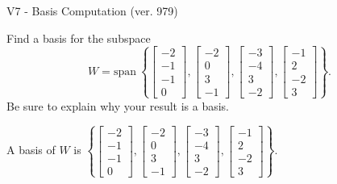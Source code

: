 \begin{exercise}
  \begin{exerciseTitle}V7 - Basis Computation (ver. 979)\end{exerciseTitle}
  \begin{exerciseStatement}
    Find a basis for the subspace 
\[W=\mathrm{span}\ \left\{\left[\begin{array}{r}
-2 \\
-1 \\
-1 \\
0
\end{array}\right] , \left[\begin{array}{r}
-2 \\
0 \\
3 \\
-1
\end{array}\right] , \left[\begin{array}{r}
-3 \\
-4 \\
3 \\
-2
\end{array}\right] , \left[\begin{array}{r}
-1 \\
2 \\
-2 \\
3
\end{array}\right]\right\}.\]
 Be sure to explain why your result is a basis.


  \end{exerciseStatement}
  \begin{exerciseAnswer}
   A basis of \(W\) is  \(\left\{\left[\begin{array}{r}
-2 \\
-1 \\
-1 \\
0
\end{array}\right] , \left[\begin{array}{r}
-2 \\
0 \\
3 \\
-1
\end{array}\right] , \left[\begin{array}{r}
-3 \\
-4 \\
3 \\
-2
\end{array}\right] , \left[\begin{array}{r}
-1 \\
2 \\
-2 \\
3
\end{array}\right]\right\}\).
  


  \end{exerciseAnswer}
\end{exercise}